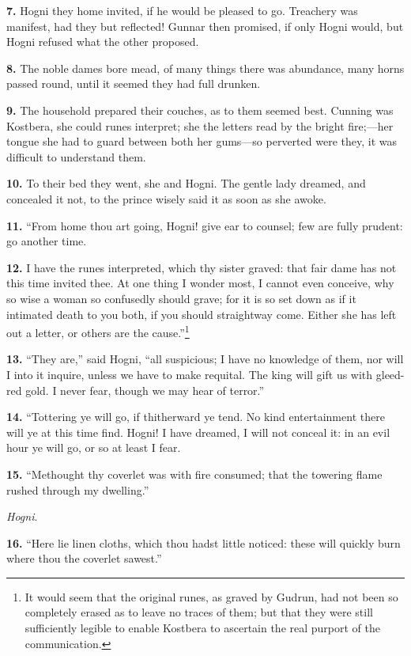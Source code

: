 \textbf{7.} Hogni they home invited, if he would be pleased to go. Treachery
was manifest, had they but reflected! Gunnar then promised, if only
Hogni would, but Hogni refused what the other proposed.

\textbf{8.} The noble dames bore mead, of many things there was abundance,
many horns passed round, until it seemed they had full drunken.

\textbf{9.} The household prepared their couches, as to them seemed best.
Cunning was Kostbera, she could runes interpret; she the letters read
by the bright fire;—her tongue she had to guard between both her
gums—so perverted were they, it was difficult to understand them.

\textbf{10.} To their bed they went, she and Hogni. The gentle lady dreamed,
and concealed it not, to the prince wisely said it as soon as she
awoke.

\textbf{11.} ``From home thou art going, Hogni! give ear to counsel; few are
fully prudent: go another time.

\textbf{12.} I have the runes interpreted, which thy sister graved: that fair
dame has not this time invited thee. At one thing I wonder most, I
cannot even conceive, why so wise a woman so confusedly should grave;
for it is so set down as if it intimated death to you both, if you
should straightway come. Either she has left out a letter, or others
are the cause.''\footnote{It would seem that the original runes, as graved by
Gudrun, had not been so completely erased as to leave no traces of
them; but that they were still sufficiently legible to enable Kostbera
to ascertain the real purport of the communication.}

\textbf{13.} ``They are,'' said Hogni, ``all suspicious; I have no knowledge of
them, nor will I into it inquire, unless we have to make requital.
The king will gift us with gleed-red gold. I never fear, though we may
hear of terror.''

\textbf{14.} ``Tottering ye will go, if thitherward ye tend. No kind
entertainment there will ye at this time find. Hogni! I have dreamed,
I will not conceal it: in an evil hour ye will go, or so at least I
fear.

\textbf{15.} ``Methought thy coverlet was with fire consumed; that the
towering flame rushed through my dwelling.''

\emph{Hogni}.

\textbf{16.} ``Here lie linen cloths, which thou hadst little noticed: these
will quickly burn where thou the coverlet sawest.''

